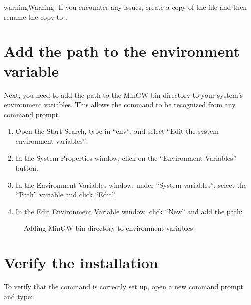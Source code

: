 \documentclass[letterpaper,10pt,english]{sphinxmanual}
\begin{document}
\begin{sphinxadmonition}{warning}{Warning:}
\sphinxAtStartPar
If you encounter any issues, create a copy of the file and then rename the copy to .
\end{sphinxadmonition}


\section{Add the path to the environment variable}
\label{\detokenize{install_windows:add-the-path-to-the-environment-variable}}
\sphinxAtStartPar
Next, you need to add the path to the MinGW bin directory to your system’s environment variables. This allows the  command to be recognized from any command prompt.
\begin{enumerate}
%
\item {} 
\sphinxAtStartPar
Open the Start Search, type in “env”, and select “Edit the system environment variables”.

\item {} 
\sphinxAtStartPar
In the System Properties window, click on the “Environment Variables” button.

\item {} 
\sphinxAtStartPar
In the Environment Variables window, under “System variables”, select the “Path” variable and click “Edit”.

\item {} 
\sphinxAtStartPar
In the Edit Environment Variable window, click “New” and add the path:

\begin{sphinxVerbatim}[commandchars=\\\{\}]
\PYGZbs{}\PYGZbs{}
\end{sphinxVerbatim}

\end{enumerate}

\begin{figure}[htbp]
\centering
\capstart

\noindent{}
\caption{Adding MinGW bin directory to environment variables}\label{\detokenize{install_windows:id5}}\label{\detokenize{install_windows:var-env}}\end{figure}


\section{Verify the installation}
\label{\detokenize{install_windows:verify-the-installation}}
\sphinxAtStartPar
To verify that the  command is correctly set up, open a new command prompt and type:
\end{document}
